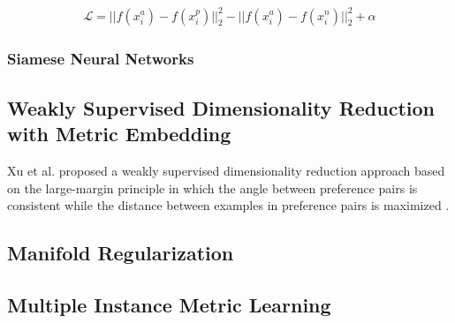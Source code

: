 		\begin{align}
			\mathcal{L} = ||f(x^{a}_{i}) - f(x^{p}_{i})||^{2}_{2} -||f(x^{a}_{i}) - f(x^{n}_{i})||^{2}_{2} + \alpha
		\end{align}
		
		
		\subsubsection{Siamese Neural Networks}
		
	\subsection{Weakly Supervised Dimensionality Reduction with Metric Embedding}
	Xu et al. proposed a weakly supervised dimensionality reduction approach based on the large-margin principle in which the angle between preference pairs is consistent while the distance between examples in preference pairs is maximized \citep{Xu2014LargeMarginWeaklySupervisedDR}.
	
	
	\subsection{Manifold Regularization}
	
	\subsection{Multiple Instance Metric Learning}
	
	\cite{Xu2011MI_Metric_Learning}



